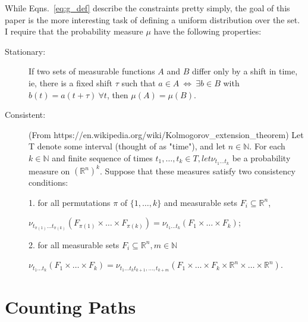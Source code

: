 \documentclass[12pt]{article} \usepackage{amsmath,amsfonts}
\newcommand{\measure}{\mu}
\begin{document}
While Eqns.~\eqref{eq:g_def} describe the constraints pretty simply,
the goal of this paper is the more interesting task of defining a
uniform distribution over the set.  I require that the probability
measure $\measure$ have the following properties:
\begin{description}
\item[Stationary:] If two sets of measurable functions $A$ and $B$
  differ only by a shift in time, ie, there is a fixed shift $\tau$
  such that $a \in A ~ \iff ~ \exists b \in B$ with $b(t) =
  a(t+\tau)~\forall t$, then $\mu(A) = \mu(B)$.
\item[Consistent:] (From
  https://en.wikipedia.org/wiki/Kolmogorov\_extension\_theorem) Let T
  denote some interval (thought of as "time"), and let $n \in
  \mathbb{N}$. For each $k \in \mathbb{N}$ and finite sequence of
  times $t_{1}, \dots, t_{k} \in T, let \nu_{t_{1} \dots t_{k}}$ be a
  probability measure on $(\mathbb{R}^{n})^{k}$. Suppose that these
  measures satisfy two consistency conditions:

  1. for all permutations $\pi$ of $\{ 1, \dots, k \}$ and measurable sets
  $F_{i} \subseteq \mathbb{R}^{n}$,

  $\nu_{t_{\pi (1)} \dots t_{\pi (k)}} \left( F_{\pi (1)} \times \dots
    \times F_{ \pi(k)} \right) = \nu_{t_{1} \dots t_{k}} \left( F_{1}
    \times \dots \times F_{k} \right)$;

  2. for all measurable sets $F_{i} \subseteq \mathbb{R}^{n},m \in
  \mathbb{N}$

  $\nu_{t_{1} \dots t_{k}} \left( F_{1} \times \dots \times F_{k}
  \right) = \nu_{t_{1} \dots t_{k} t_{k + 1}, \dots , t_{k+m}} \left(
    F_{1} \times \dots \times F_{k} \times \mathbb{R}^{n} \times \dots
    \times \mathbb{R}^{n} \right)$.
\end{description}

\section{Counting Paths}
\label{sec:counting}
\end{document}
